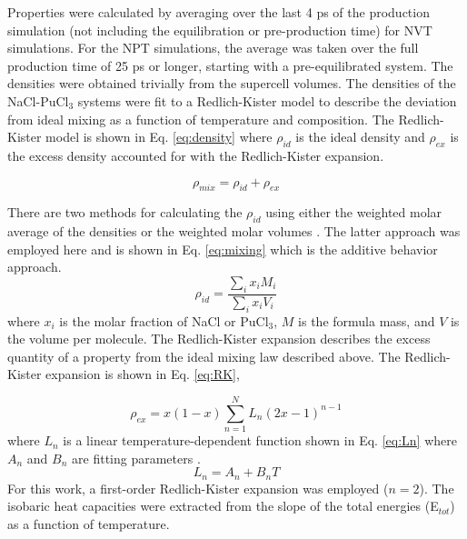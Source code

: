 \documentclass[review]{elsarticle}
\begin{document}
Properties were calculated by averaging over the last 4 ps of the production simulation (not including the equilibration or pre-production time) for NVT simulations. For the NPT simulations, the average was taken over the full production time of 25 ps or longer, starting with a pre-equilibrated system. The densities were obtained trivially from the supercell volumes. The densities of the NaCl-PuCl$_3$ systems were fit to a Redlich-Kister model to describe the deviation from ideal mixing as a function of temperature and composition. The Redlich-Kister model is shown in Eq. \ref{eq:density} where $\rho_{id}$ is the ideal density and $\rho_{ex}$ is the excess density accounted for with the Redlich-Kister expansion.

\begin{equation}
 \label{eq:density}
   \rho_{mix} = \rho_{id} + \rho_{ex}
\end{equation}

There are two methods for calculating the $\rho_{id}$ using either the weighted molar average of the densities \cite{guo1989density, cooper1991densities} or the weighted molar volumes \cite{agca2022, chrenkova2003density, mlynarikova2017volume}. The latter approach was employed here and is shown in Eq. \ref{eq:mixing} which is the additive behavior approach.
\begin{equation}
  \label{eq:mixing} 
     \rho_{id} = \frac{\sum_i x_iM_{i}}{\sum_i x_iV_{i}}
\end{equation}
where $x_i$ is the molar fraction of NaCl or PuCl$_3$, $M$ is the formula mass, and $V$ is the volume per molecule. The Redlich-Kister expansion \cite{redlich1948} describes the excess quantity of a property from the ideal mixing law described above. The Redlich-Kister expansion is shown in Eq. \ref{eq:RK},

\begin{equation}
  \label{eq:RK}
     \rho_{ex} = x(1-x) \sum_{n=1}^{N} L_n(2x-1)^{n-1}
\end{equation} where $L_{n}$ is a linear temperature-dependent function shown in Eq. \ref{eq:Ln} where $A_n$ and $B_n$ are fitting parameters \cite{agca2022}. 
\begin{equation}
  \label{eq:Ln}
     L_n = A_n+B_nT
\end{equation}
For this work, a first-order Redlich-Kister expansion was employed ($n=2$). The isobaric heat capacities were extracted from the slope of the total energies (E$_{tot}$) as a function of temperature.
\end{document}
